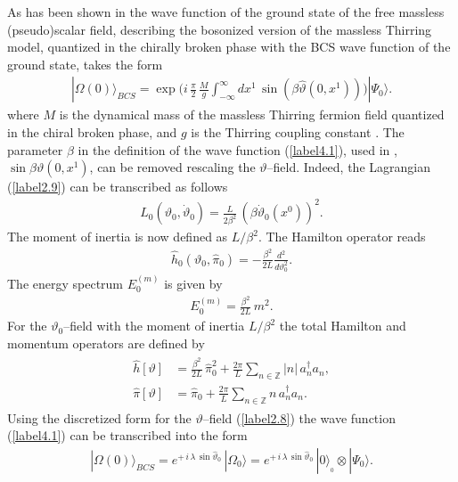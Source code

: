 \documentclass[a4paper,12pt] {article}
\begin{document}
\hspace{0.2in} As has been shown in \cite{th0210104} the wave function
of the ground state of the free massless (pseudo)scalar field,
describing the bosonized version of the massless Thirring model,
quantized in the chirally broken phase with the BCS wave function of
the ground state, takes the form
%
\begin{eqnarray}\label{label4.1}
|\Omega(0)\rangle_{BCS} = \exp\Big(i\,\frac{\pi}{2}\,\frac{M}{g}
\int^{\infty}_{-\infty}dx^1\,\sin(\beta\hat{\vartheta}(0,x^1))\Big)
|\Psi_0\rangle.
\end{eqnarray}
%
where $M$ is the dynamical mass of the massless Thirring fermion field
quantized in the chiral broken phase, and $g$ is the Thirring coupling
constant \cite{th0105057}. The parameter $\beta$ in the definition of
the wave function (\ref{label4.1}), used in \cite{th0210104},
$\sin\beta\vartheta(0,x^1)$, can be removed rescaling the
$\vartheta$--field. Indeed, the Lagrangian (\ref{label2.9}) can be
transcribed as follows
%
\begin{eqnarray}\label{label4.2}
L_0(\vartheta_0,\dot{\vartheta}_0) =
\frac{L}{2\beta^2}\,(\beta\dot{\vartheta}_0(x^0))^2.
\end{eqnarray}
%
The moment of inertia is now defined as $L/\beta^2$. The Hamilton
operator reads
%
\begin{eqnarray}\label{label4.3}
\hat{h}_0(\vartheta_0,\hat{\pi}_0) = -\frac{\beta^2}{2 L}\frac{d^2}{d
\vartheta^2_0}.
\end{eqnarray}
%
The energy spectrum $E^{(m)}_0$ is given by
%
\begin{eqnarray}\label{label4.4}
E^{(m)}_0 = \frac{\beta^2}{2L}\,m^2.
\end{eqnarray}
%
For the $\vartheta_0$--field with the moment of inertia $L/\beta^2$
the total Hamilton and momentum operators are defined by
%
\begin{eqnarray}\label{label4.5}
\begin{aligned}
\hat{h}[\vartheta] &= \frac{\beta^2}{2L}\,\hat{\pi}^2_0 +
\frac{2\pi}{L}\sum_{n \in \mathbb{Z}}|n|\,a^{\dagger}_n a_n,\\
\hat{\pi}[\vartheta] &= \hat{\pi}_0 +
\frac{2\pi}{L}\sum_{n \in \mathbb{Z}}n\,a^{\dagger}_n a_n.
\end{aligned}
\end{eqnarray}
%
Using the discretized form for the $\vartheta$--field (\ref{label2.8})
the wave function (\ref{label4.1}) can be transcribed into the form
%
\begin{eqnarray}\label{label4.6}
|\Omega(0)\rangle_{BCS} = e^{\textstyle +\,i\,\lambda\,\sin
\hat{\vartheta}_0}\,|\Omega_0\rangle = e^{\textstyle
+\,i\,\lambda\,\sin \hat{\vartheta}_0}\,|0\rangle_{_0} \otimes
|\Psi_0\rangle.
\end{eqnarray}
\end{document}
